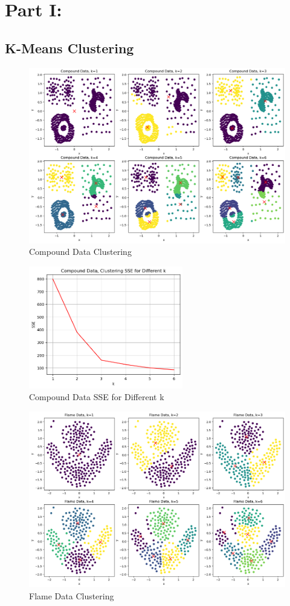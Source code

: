 \documentclass{article}
\begin{document}
\section{Part I:}
\subsection{K-Means Clustering}
\begin{figure}[H]
    \centering
    \includegraphics[width=\textwidth]{compound_p.png}
    \caption{Compound Data Clustering}
\end{figure}
\begin{figure}[H]
    \centering
    \includegraphics[width=0.6\textwidth]{compound_s.png}
    \caption{Compound Data SSE for Different k}
\end{figure}
\begin{figure}[H]
    \centering
    \includegraphics[width=\textwidth]{flame_p.png}
    \caption{Flame Data Clustering}
\end{figure}
\end{document}
